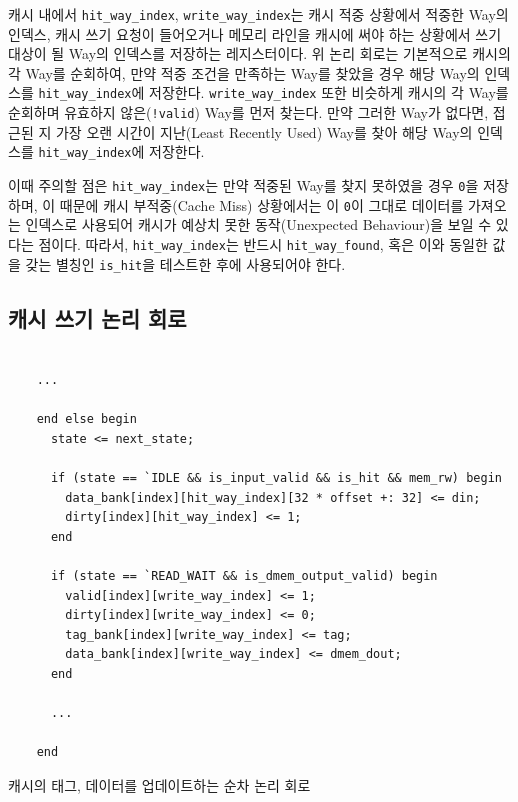 \documentclass[openright, a4paper]{article}
\newcommand{\code}[1]{\texttt{#1}}
\newenvironment{longlisting}{\captionsetup{type=listing}}{}
\begin{document}
\hfill

캐시 내에서 \code{hit_way_index}, \code{write_way_index}는 캐시 적중 상황에서
적중한 Way의 인덱스, 캐시 쓰기 요청이 들어오거나 메모리 라인을 캐시에 써야 하는
상황에서 쓰기 대상이 될 Way의 인덱스를 저장하는 레지스터이다. 위 논리 회로는 
기본적으로 캐시의 각 Way를 순회하여, 만약 적중 조건을 만족하는 Way를 찾았을 경우
해당 Way의 인덱스를 \code{hit_way_index}에 저장한다. \code{write_way_index} 또한
비슷하게 캐시의 각 Way를 순회하며 유효하지 않은(\code{!valid}) Way를 먼저 찾는다.
만약 그러한 Way가 없다면, 접근된 지 가장 오랜 시간이 지난(Least Recently Used) 
Way를 찾아 해당 Way의 인덱스를 \code{hit_way_index}에 저장한다.

이때 주의할 점은 \code{hit_way_index}는 만약 적중된 Way를 찾지 못하였을 경우
\code{0}을 저장하며, 이 때문에 캐시 부적중(Cache Miss) 상황에서는 이 \code{0}이
그대로 데이터를 가져오는 인덱스로 사용되어 캐시가 예상치 못한 동작(Unexpected
Behaviour)을 보일 수 있다는 점이다. 따라서, \code{hit_way_index}는 반드시 
\code{hit_way_found}, 혹은 이와 동일한 값을 갖는 별칭인 \code{is_hit}을 테스트한
후에 사용되어야 한다.

\subsection{캐시 쓰기 논리 회로}

\hfill

\begin{longlisting}
    \begin{verbatim}

    ...

    end else begin
      state <= next_state;

      if (state == `IDLE && is_input_valid && is_hit && mem_rw) begin
        data_bank[index][hit_way_index][32 * offset +: 32] <= din;
        dirty[index][hit_way_index] <= 1;
      end 
      
      if (state == `READ_WAIT && is_dmem_output_valid) begin
        valid[index][write_way_index] <= 1;
        dirty[index][write_way_index] <= 0;
        tag_bank[index][write_way_index] <= tag;
        data_bank[index][write_way_index] <= dmem_dout;
      end

      ...

    end
    \end{verbatim}
    \caption{캐시의 태그, 데이터를 업데이트하는 순차 논리 회로}
\end{longlisting}

\hfill
\end{document}
